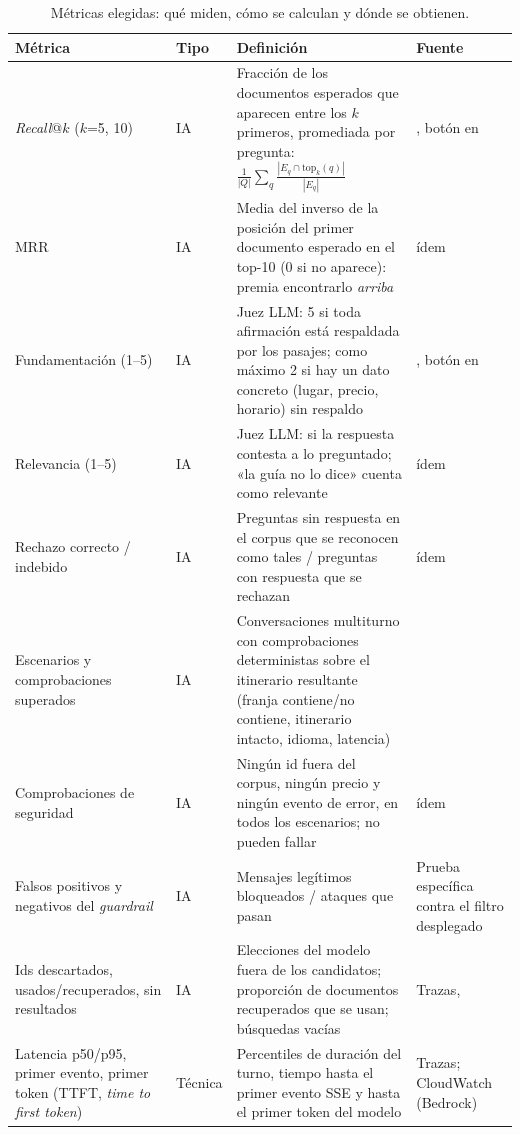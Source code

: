 \begin{table}[t]
\centering\scriptsize
\caption{Métricas elegidas: qué miden, cómo se calculan y dónde se obtienen.}\label{tab:metricas}
\begin{tabularx}{\textwidth}{@{}L{2.55cm}L{0.9cm}YL{3.3cm}@{}}
\toprule
\textbf{Métrica} & \textbf{Tipo} & \textbf{Definición} & \textbf{Fuente} \\
\midrule
\emph{Recall}@$k$ ($k$=5, 10) & IA & Fracción de los documentos esperados que aparecen entre los $k$ primeros, promediada por pregunta: $\frac{1}{|Q|}\sum_q \frac{|E_q \cap \text{top}_k(q)|}{|E_q|}$ & , botón en  \\
MRR & IA & Media del inverso de la posición del primer documento esperado en el top-10 (0 si no aparece): premia encontrarlo \emph{arriba} & ídem \\
Fundamentación (1--5) & IA & Juez LLM: 5 si toda afirmación está respaldada por los pasajes; como máximo 2 si hay un dato concreto (lugar, precio, horario) sin respaldo & , botón en  \\
Relevancia (1--5) & IA & Juez LLM: si la respuesta contesta a lo preguntado; «la guía no lo dice» cuenta como relevante & ídem \\
Rechazo correcto / indebido & IA & Preguntas sin respuesta en el corpus que se reconocen como tales / preguntas con respuesta que se rechazan & ídem \\
Escenarios y comprobaciones superados & IA & Conversaciones multiturno con comprobaciones deterministas sobre el itinerario resultante (franja contiene/no contiene, itinerario intacto, idioma, latencia) &  \\
Comprobaciones de seguridad & IA & Ningún id fuera del corpus, ningún precio y ningún evento de error, en todos los escenarios; no pueden fallar & ídem \\
Falsos positivos y negativos del \emph{guardrail} & IA & Mensajes legítimos bloqueados / ataques que pasan & Prueba específica contra el filtro desplegado \\
Ids descartados, usados/recuperados, sin resultados & IA & Elecciones del modelo fuera de los candidatos; proporción de documentos recuperados que se usan; búsquedas vacías & Trazas,  \\
Latencia p50/p95, primer evento, primer token (TTFT, \emph{time to first token}) & Técnica & Percentiles de duración del turno, tiempo hasta el primer evento SSE y hasta el primer token del modelo & Trazas; CloudWatch (Bedrock) \\

\end{tabularx}
\end{table}
